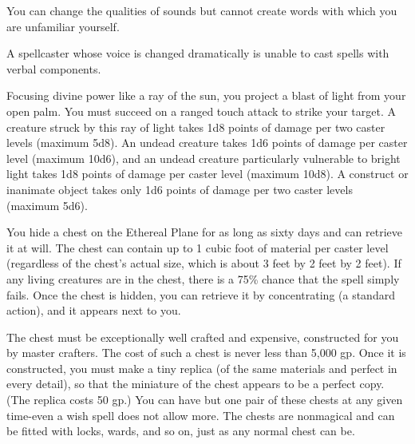 \begin{multicols}{2}
\begin{small}
\smallskip\noindent You can change the qualities of sounds but cannot create words with which you are unfamiliar yourself.

\smallskip\noindent A spellcaster whose voice is changed dramatically is unable to cast spells with verbal components.

\noindent Focusing divine power like a ray of the sun, you project a blast of light from your open palm. You must succeed on a ranged touch attack to strike your target. A creature struck by this ray of light takes 1d8 points of damage per two caster levels (maximum 5d8). An undead creature takes 1d6 points of damage per caster level (maximum 10d6), and an undead creature particularly vulnerable to bright light takes 1d8 points of damage per caster level (maximum 10d8). A construct or inanimate object takes only 1d6 points of damage per two caster levels (maximum 5d6).

\noindent You hide a chest on the Ethereal Plane for as long as sixty days and can retrieve it at will. The chest can contain up to 1 cubic foot of material per caster level (regardless of the chest's actual size, which is about 3 feet by 2 feet by 2 feet). If any living creatures are in the chest, there is a 75\% chance that the spell simply fails. Once the chest is hidden, you can retrieve it by concentrating (a standard action), and it appears next to you.

\smallskip\noindent The chest must be exceptionally well crafted and expensive, constructed for you by master crafters. The cost of such a chest is never less than 5,000 gp. Once it is constructed, you must make a tiny replica (of the same materials and perfect in every detail), so that the miniature of the chest appears to be a perfect copy. (The replica costs 50 gp.) You can have but one pair of these chests at any given time-even a wish spell does not allow more. The chests are nonmagical and can be fitted with locks, wards, and so on, just as any normal chest can be.


\end{small}
\end{multicols}
